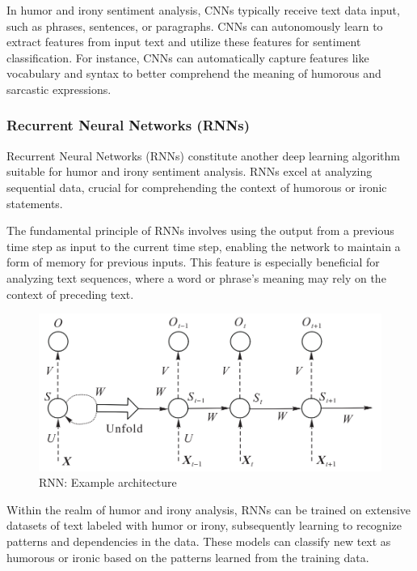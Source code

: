 \documentclass[a4paper]{article}
\begin{document}
In humor and irony sentiment analysis, CNNs typically receive text data input, such as phrases, sentences, or paragraphs. CNNs can autonomously learn to extract features from input text and utilize these features for sentiment classification. For instance, CNNs can automatically capture features like vocabulary and syntax to better comprehend the meaning of humorous and sarcastic expressions.

\subsubsection{Recurrent Neural Networks (RNNs)}

Recurrent Neural Networks (RNNs) constitute another deep learning algorithm suitable for humor and irony sentiment analysis. RNNs excel at analyzing sequential data, crucial for comprehending the context of humorous or ironic statements.

The fundamental principle of RNNs involves using the output from a previous time step as input to the current time step, enabling the network to maintain a form of memory for previous inputs. This feature is especially beneficial for analyzing text sequences, where a word or phrase's meaning may rely on the context of preceding text.

\begin{figure}[H]
	\centering
	\includegraphics[width=1\textwidth]{./images/RNN_architecture.png}
	\caption{RNN: Example architecture}
	\label{fig.RNN[Review of applications of natural language processing in text sentiment analysis]}
\end{figure}

Within the realm of humor and irony analysis, RNNs can be trained on extensive datasets of text labeled with humor or irony, subsequently learning to recognize patterns and dependencies in the data. These models can classify new text as humorous or ironic based on the patterns learned from the training data.
\end{document}
